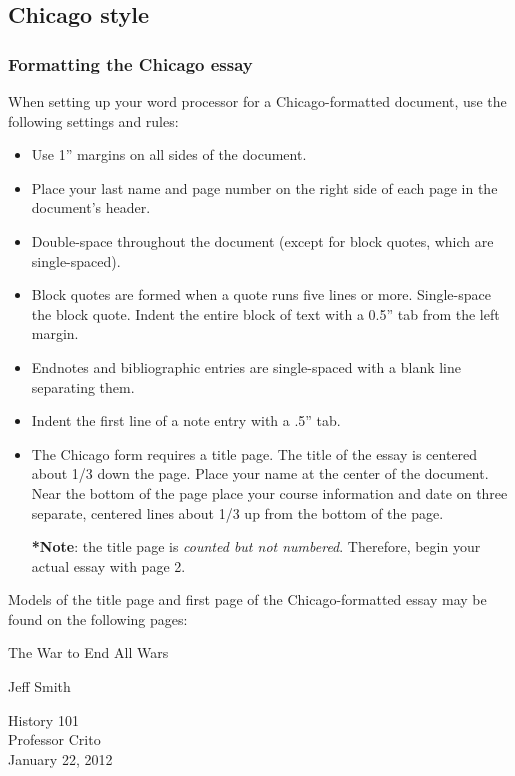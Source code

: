 

\subsection{Chicago style}

\subsubsection {Formatting the Chicago essay}

When setting up your word processor for a Chicago-formatted document, use the following settings and rules:

\begin{itemize}

\item Use 1'' margins on all sides of the document.
\item Place your last name and page number on the right side of each page in the document's header.
\item Double-space throughout the document (except for block quotes, which are single-spaced).
\item Block quotes are formed when a quote runs five lines or more. Single-space the block quote. Indent the entire block of text with a 0.5'' tab from the left margin.
\item Endnotes and bibliographic entries are single-spaced with a blank line separating them.
\item Indent the first line of a note entry with a .5'' tab.
\item The Chicago form requires a title page. The title of the essay is centered about 1/3 down the page. Place your name at the center of the document. Near the bottom of the page place your course information and date on three separate, centered lines about 1/3 up from the bottom of the page.

\textbf{*}\textbf{Note}: the title page is \emph{counted but not numbered}. Therefore, begin your actual essay with page 2.
\end{itemize}

Models of the title page and first page of the Chicago-formatted essay may be found on the following pages:

\newpage
\thispagestyle{empty}
\begin{doublespace}
\vspace* {3cm}
\begin{center}The War to End All Wars\end{center}
\vspace {4cm}
\begin{center}Jeff Smith\end{center}
\vspace {7.2cm}
\begin{center}History 101\\
Professor Crito\\
January 22, 2012\end{center}
\end{doublespace}
\newpage

